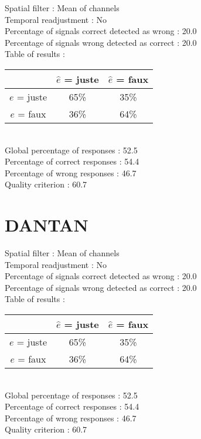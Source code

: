 Spatial filter : Mean of channels \\
Temporal readjustment : No \\
Percentage of signals correct detected as wrong :   20.0 \\
Percentage of signals wrong detected as correct :   20.0 \\
Table of results : \\
\begin{tabular}{|c|c|c|}
\hline				& $\hat{e}$ = juste & $\hat{e}$ = faux \\
\hline  $e$ = juste	&     65\%			&     35\%		\\
\hline  $e$ = faux	&     36\%			&     64\%		\\
\hline
\end{tabular}\\
Global percentage of responses :   52.5 \\
Percentage of correct responses :   54.4 \\
Percentage of wrong responses :   46.7 \\
Quality criterion :   60.7 \\

\section*{DANTAN}
Spatial filter : Mean of channels \\
Temporal readjustment : No \\
Percentage of signals correct detected as wrong :   20.0 \\
Percentage of signals wrong detected as correct :   20.0 \\
Table of results : \\
\begin{tabular}{|c|c|c|}
\hline				& $\hat{e}$ = juste & $\hat{e}$ = faux \\
\hline  $e$ = juste	&     65\%			&     35\%		\\
\hline  $e$ = faux	&     36\%			&     64\%		\\
\hline
\end{tabular}\\
Global percentage of responses :   52.5 \\
Percentage of correct responses :   54.4 \\
Percentage of wrong responses :   46.7 \\
Quality criterion :   60.7 \\

